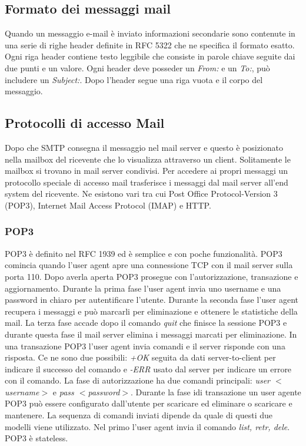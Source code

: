 \subsection{Formato dei messaggi mail}
Quando un messaggio e-mail \`e inviato informazioni secondarie sono contenute in una serie di righe header definite in RFC 5322 che ne specifica il formato esatto. Ogni riga header contiene testo leggibile che
consiste in parole chiave seguite dai due punti e un valore. Ogni header deve posseder un \emph{From:} e un \emph{To:}, pu\`o includere un \emph{Subject:}. Dopo l'header segue una riga vuota e il corpo del
messaggio. 
\subsection{Protocolli di accesso Mail}
Dopo che SMTP consegna il messaggio nel mail server e questo \`e posizionato nella mailbox del ricevente che lo visualizza attraverso un client. Solitamente le mailbox si trovano in mail server condivisi. Per 
accedere ai propri messaggi un protocollo speciale di accesso mail trasferisce i messaggi dal mail server all'end system del ricevente. Ne esistono vari tra cui Post Office Protocol-Version 3 (POP3), Internet
Mail Access Protocol (IMAP) e HTTP.
\subsubsection{POP3}
POP3 \`e definito nel RFC 1939 ed \`e semplice e con poche funzionalit\`a. POP3 comincia quando l'user agent apre una connessione TCP con il mail server sulla porta 110. Dopo averla aperta POP3 prosegue 
con l'autorizzazione, transazione e aggiornamento. Durante la prima fase l'user agent invia uno username  e una password in chiaro per autentificare l'utente. Durante la seconda fase l'user agent recupera i
messaggi e pu\`o marcarli per eliminazione e ottenere le statistiche della mail. La terza fase accade dopo il comando \emph{quit} che finisce la sessione POP3 e durante questa fase il mail server elimina i 
messaggi marcati per eliminazione. In una transazione POP3 l'user agent invia comandi e il server risponde con una risposta. Ce ne sono due possibili: \emph{+OK} seguita da dati server-to-client per indicare
il successo del comando e \emph{-ERR} usato dal server per indicare un errore con il comando. La fase di autorizzazione ha due comandi principali: \emph{user $<$username$>$} e \emph{
pass $<$password$>$}.  Durante la fase idi transazione un user agente POP3 pu\`o essere configurato dall'utente per scaricare ed eliminare o scaricare e mantenere. La sequenza di comandi inviati dipende
da quale di questi due modelli viene utilizzato. Nel primo l'user agent invia il comando \emph{list, retr, dele}. POP3 \`e stateless.
